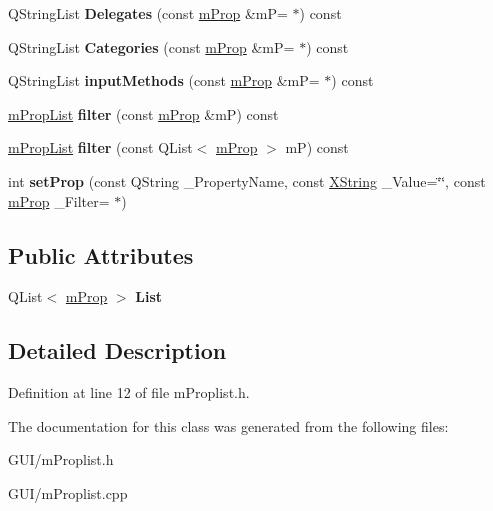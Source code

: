 \begin{DoxyCompactItemize}
Q\+String\+List {\bfseries Delegates} (const \hyperlink{classm_prop}{m\+Prop} \&mP=\textquotesingle{} $\ast$\textquotesingle{}) const
\item 
\mbox{\label{classm_prop_list_a99eb2b66e19b272db93c4bc0cade1fdb}} 
Q\+String\+List {\bfseries Categories} (const \hyperlink{classm_prop}{m\+Prop} \&mP=\textquotesingle{} $\ast$\textquotesingle{}) const
\item 
\mbox{\label{classm_prop_list_ad64869b7f0926880bb20ebc192c018e3}} 
Q\+String\+List {\bfseries input\+Methods} (const \hyperlink{classm_prop}{m\+Prop} \&mP=\textquotesingle{} $\ast$\textquotesingle{}) const
\item 
\mbox{\label{classm_prop_list_a8e55ccaaf192f0ef35b1f61b5e3a9159}} 
\hyperlink{classm_prop_list}{m\+Prop\+List} {\bfseries filter} (const \hyperlink{classm_prop}{m\+Prop} \&mP) const
\item 
\mbox{\label{classm_prop_list_ae725a230c51e0eb4dc984da6eeeb45e6}} 
\hyperlink{classm_prop_list}{m\+Prop\+List} {\bfseries filter} (const Q\+List$<$ \hyperlink{classm_prop}{m\+Prop} $>$ mP) const
\item 
\mbox{\label{classm_prop_list_ac00a09f022af6e0eb7fe770d22acd6bb}} 
int {\bfseries set\+Prop} (const Q\+String \+\_\+\+Property\+Name, const \hyperlink{class_x_string}{X\+String} \+\_\+\+Value=\char`\"{}\char`\"{}, const \hyperlink{classm_prop}{m\+Prop} \+\_\+\+Filter=\textquotesingle{} $\ast$\textquotesingle{})
\end{DoxyCompactItemize}
\subsection*{Public Attributes}
\begin{DoxyCompactItemize}
\item 
\mbox{\label{classm_prop_list_a8bc4f3e94f031b3d88f3682977424295}} 
Q\+List$<$ \hyperlink{classm_prop}{m\+Prop} $>$ {\bfseries List}
\end{DoxyCompactItemize}


\subsection{Detailed Description}


Definition at line 12 of file m\+Proplist.\+h.



The documentation for this class was generated from the following files\+:\begin{DoxyCompactItemize}
\item 
G\+U\+I/m\+Proplist.\+h\item 
G\+U\+I/m\+Proplist.\+cpp\end{DoxyCompactItemize}
